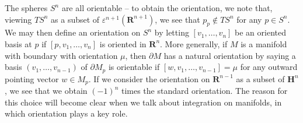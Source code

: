 \begin{example}
The spheres $S^n$ are all orientable -- to obtain the orientation, we note that, viewing $TS^n$ as a subset of $\varepsilon^{n+1}(\mathbf{R}^{n+1})$, we see that $p_p \not \in TS^n$ for any $p \in S^n$. We may then define an orientation on $S^n$ by letting $[v_1, \dots, v_n]$ be an oriented basis at $p$ if $[p,v_1, \dots, v_n]$ is oriented in $\mathbf{R}^n$. More generally, if $M$ is a manifold with boundary with orientation $\mu$, then $\partial M$ has a natural orientation by saying a basis $(v_1, \dots, v_{n-1})$ of $\partial M_p$ is orientable if $[w, v_1, \dots, v_{n-1}] = \mu$ for any outward pointing vector $w \in M_p$. If we consider the orientation on $\mathbf{R}^{n-1}$ as a subset of $\mathbf{H}^n$, we see that we obtain $(-1)^n$ times the standard orientation. The reason for this choice will become clear when we talk about integration on manifolds, in which orientation plays a key role.
\end{example}

